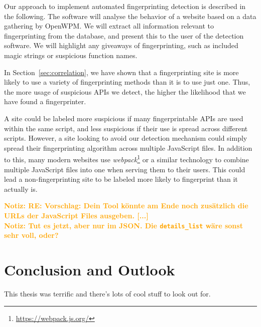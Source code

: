 \documentclass[
    fontsize=12pt,
    headings=small,
    parskip=half,
    bibliography=totoc,
    numbers=noenddot,
    open=any
    ]{scrreprt}
\newcommand{\dominik}[1]{\textcolor{orange}{\textbf{Notiz: #1}}}
\begin{document}
Our approach to implement automated fingerprinting detection is described in the following.
The software will analyse the behavior of a website based on a data gathering by OpenWPM.
We will extract all information relevant to fingerprinting from the database,
and present this to the user of the detection software.
We will highlight any giveaways of fingerprinting, such as included magic strings
or suspicious function names.

In Section~\ref{sec:correlation}, we have shown that a fingerprinting site is more
likely to use a variety of fingerprinting methods than it is to use just one.
Thus, the more usage of suspicious APIs we detect, the higher the likelihood
that we have found a fingerprinter.

A site could be labeled more suspicious if many fingerprintable APIs are used within the same script,
and less suspicious if their use is spread across different scripts.
However, a site looking to avoid our detection mechanism could simply
spread their fingerprinting algorithm across multiple JavaScript files.
In addition to this, many modern websites use \textit{webpack}\footnote{\url{https://webpack.js.org/}}
or a similar technology to combine multiple JavaScript files into one when serving
them to their users. This could lead a non-fingerprinting site to be labeled
more likely to fingerprint than it actually is.

\dominik{RE: Vorschlag: Dein Tool könnte am Ende noch zusätzlich die URLs der JavaScript Files ausgeben. [...]} \\
\dominik{Tut es jetzt, aber nur im JSON. Die \texttt{details\_list} wäre sonst sehr voll, oder?}


\chapter{Conclusion and Outlook}
This thesis was terrific and there's lots of cool stuff to look out for.

\end{document}
